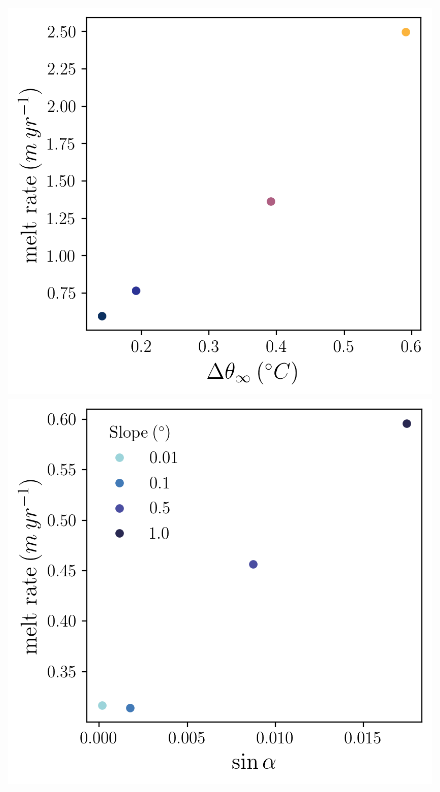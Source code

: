 \documentclass[draft]{styles/agujournal2019}
\begin{document}
\begin{figure}[h!]
    \centering
    \begin{minipage}{0.5\textwidth}
        \includegraphics[trim={0 0 0 0},clip,width=\textwidth]{Figures/melt_dT_cmp_dT_43h_tav13h.png}
    \end{minipage}%
    \begin{minipage}{0.5\textwidth}
        \includegraphics[trim={0 0 0 0},clip,width=\textwidth]{Figures/melt_slope_cmp_dslope_43h_tav13h.png}

\end{minipage}
\end{figure}
\end{document}
